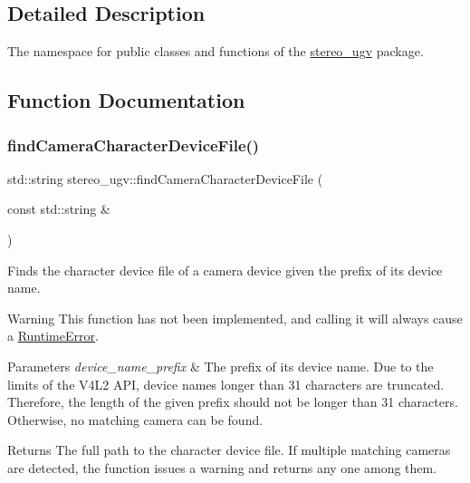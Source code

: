 \subsection{Detailed Description}
The namespace for public classes and functions of the \hyperlink{namespacestereo__ugv}{stereo\+\_\+ugv} package. 

\subsection{Function Documentation}
\mbox{\label{namespacestereo__ugv_af45c67058883fb26e2c27945af6ab490}} 
\subsubsection{\texorpdfstring{find\+Camera\+Character\+Device\+File()}{findCameraCharacterDeviceFile()}}
{\footnotesize\ttfamily std\+::string stereo\+\_\+ugv\+::find\+Camera\+Character\+Device\+File (\begin{DoxyParamCaption}\item[{const std\+::string \&}]{ }\end{DoxyParamCaption})}



Finds the character device file of a camera device given the prefix of its device name. 

\begin{DoxyWarning}{Warning}
This function has not been implemented, and calling it will always cause a \hyperlink{classstereo__ugv_1_1RuntimeError}{Runtime\+Error}. 
\end{DoxyWarning}

\begin{DoxyParams}{Parameters}
{\em device\+\_\+name\+\_\+prefix} & The prefix of its device name. Due to the limits of the V4\+L2 A\+PI, device names longer than 31 characters are truncated. Therefore, the length of the given prefix should not be longer than 31 characters. Otherwise, no matching camera can be found. \\
\hline
\end{DoxyParams}
\begin{DoxyReturn}{Returns}
The full path to the character device file. If multiple matching cameras are detected, the function issues a warning and returns any one among them. 
\end{DoxyReturn}
\mbox{\label{namespacestereo__ugv_a6971cc11001fdf589a71f6fb3099c65b}} 
